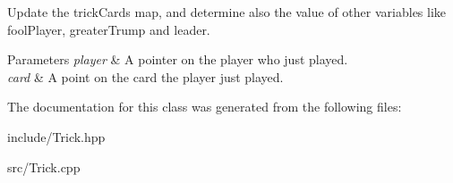 \-Update the trick\-Cards map, and determine also the value of other variables like fool\-Player, greater\-Trump and leader. 


\begin{DoxyParams}{\-Parameters}
{\em player} & \-A pointer on the player who just played. \\
\hline
{\em card} & \-A point on the card the player just played. \\
\hline
\end{DoxyParams}


\-The documentation for this class was generated from the following files\-:\begin{DoxyCompactItemize}
\item 
include/\-Trick.\-hpp\item 
src/\-Trick.\-cpp\end{DoxyCompactItemize}
